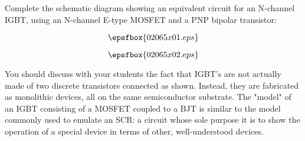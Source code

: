 

Complete the schematic diagram showing an equivalent circuit for an N-channel IGBT, using an N-channel E-type MOSFET and a PNP bipolar transistor:

$$\epsfbox{02065x01.eps}$$







$$\epsfbox{02065x02.eps}$$







You should discuss with your students the fact that IGBT's are not actually made of two discrete transistors connected as shown.  Instead, they are fabricated as monolithic devices, all on the same semiconductor substrate.  The "model" of an IGBT consisting of a MOSFET coupled to a BJT is similar to the model commonly used to emulate an SCR: a circuit whose sole purpose it is to show the operation of a special device in terms of other, well-understood devices.




